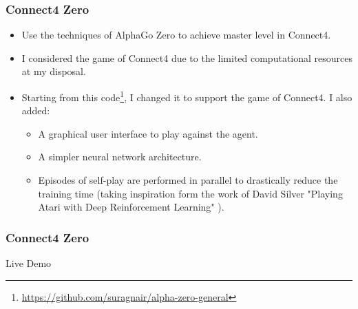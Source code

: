 \documentclass[10pt]{beamer}
\begin{document}
\begin{frame}
	\frametitle{Connect4 Zero}

	\begin{itemize}
		\item Use the techniques of AlphaGo Zero \cite{silver2017mastering} to achieve master level in Connect4.
		\item I considered the game of Connect4 due to the limited computational resources at my disposal.
		\item Starting from this code\footnote{\url{https://github.com/suragnair/alpha-zero-general}}, I changed it to support the game of Connect4. I also added:
		\begin{itemize}
			\item A graphical user interface to play against the agent.
			\item A simpler neural network architecture.
			\item Episodes of self-play are performed in parallel to drastically reduce the training time (taking inspiration form the work of David Silver "Playing Atari with Deep Reinforcement Learning" \cite{mnih2013atari}).

		\end{itemize}

	\end{itemize}

\end{frame}

\begin{frame}
	\frametitle{Connect4 Zero}
	\Huge{\centerline{Live Demo}}

\end{frame}

\end{document}
